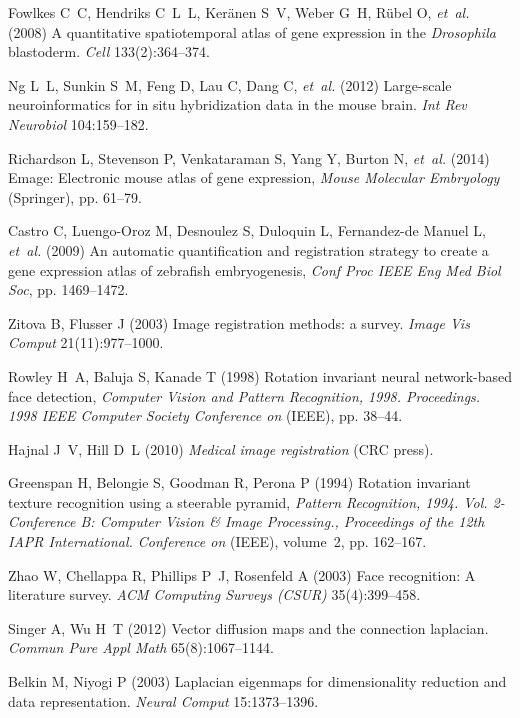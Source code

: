 \documentclass{pnastwo}
\begin{document}
\begin{article}
\begin{thebibliography}{10}
Fowlkes C~C, Hendriks C~L~L, Ker{\"a}nen S~V, Weber G~H, R{\"u}bel O,
  \textit{et~al.} (2008) A quantitative spatiotemporal atlas of gene expression
  in the \textit{{D}rosophila} blastoderm. \textit{Cell} 133(2):364--374.

Ng L~L, Sunkin S~M, Feng D, Lau C, Dang C, \textit{et~al.} (2012) Large-scale
  neuroinformatics for in situ hybridization data in the mouse brain.
  \textit{Int Rev Neurobiol} 104:159--182.

Richardson L, Stevenson P, Venkataraman S, Yang Y, Burton N, \textit{et~al.}
  (2014) Emage: Electronic mouse atlas of gene expression, \textit{Mouse
  Molecular Embryology} (Springer), pp. 61--79.

Castro C, Luengo-Oroz M, Desnoulez S, Duloquin L, Fernandez-de Manuel L,
  \textit{et~al.} (2009) An automatic quantification and registration strategy
  to create a gene expression atlas of zebrafish embryogenesis,
  \textit{Conf Proc IEEE Eng Med Biol Soc}, pp. 1469--1472.

Zitova B, Flusser J (2003) Image registration methods: a survey. \textit{Image Vis Comput} 21(11):977--1000.

Rowley H~A, Baluja S, Kanade T (1998) Rotation invariant neural network-based
  face detection, \textit{Computer Vision and Pattern Recognition, 1998.
  Proceedings. 1998 IEEE Computer Society Conference on} (IEEE), pp. 38--44.

Hajnal J~V, Hill D~L (2010) \textit{Medical image registration} (CRC press).

Greenspan H, Belongie S, Goodman R, Perona P (1994) Rotation invariant texture
  recognition using a steerable pyramid, \textit{Pattern Recognition, 1994.
  Vol. 2-Conference B: Computer Vision \& Image Processing., Proceedings of the
  12th IAPR International. Conference on} (IEEE), volume~2, pp. 162--167.

Zhao W, Chellappa R, Phillips P~J, Rosenfeld A (2003) Face recognition: A
  literature survey. \textit{ACM Computing Surveys (CSUR)} 35(4):399--458.

Singer A, Wu H~T (2012) Vector diffusion maps and the connection laplacian.
  \textit{Commun Pure Appl Math} 65(8):1067--1144.

Belkin M, Niyogi P (2003) Laplacian eigenmaps for dimensionality reduction and
  data representation. \textit{Neural Comput} 15:1373--1396.


\end{thebibliography}
\end{article}
\end{document}

